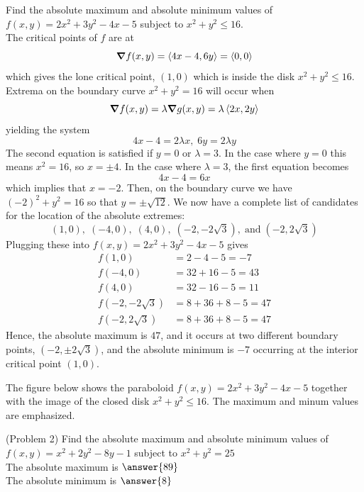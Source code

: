 \documentclass[handout]{ximera}
\begin{document}
\begin{example}[Example 2]
Find the absolute maximum and absolute minimum values 
of $f(x,y) = 2x^2 + 3y^2 - 4x - 5$ subject to $x^2 + y^2 \leq 16$.\\
The critical points of $f$ are at
\[
\boldsymbol\nabla f(x,y) = \left\langle 4x -4, 6y\right\rangle = \left\langle 0,0\right\rangle
\]
 which gives the lone critical point, $(1,0)$ which is inside the disk $x^2 + y^2 \leq 16$.\\
 Extrema on the boundary curve $x^2 + y^2 = 16$ will occur when
 \[
 \boldsymbol\nabla f(x,y) = \lambda \boldsymbol\nabla g(x,y) = \lambda \left\langle 2x, 2y\right\rangle
 \]
 yielding the system
 \[
 4x - 4 = 2\lambda x, \; 6y = 2\lambda y
 \]
 The second equation is satisfied if $y = 0$ or $\lambda = 3$.  In the case where $y = 0$ this means $x^2 = 16$, so $x = \pm 4$.
 In the case where $\lambda = 3$, the first equation becomes
 \[
 4x - 4 = 6x 
 \]
 which implies that $x = -2$.  Then, on the boundary curve we have $(-2)^2 + y^2 = 16$ so that $y = \pm \sqrt{12}$.
 We now have a complete list of candidates for the location of the absolute extremes:
 \[
 (1,0), \; (-4, 0), \; (4,0), \; (-2, -2\sqrt3), \;\text{and} \; (-2, 2\sqrt 3)
 \]
 Plugging these into $f(x,y) = 2x^2 + 3y^2 - 4x - 5$ gives
 \begin{align*}
 f(1,0) &= 2-4-5=-7\\
 f(-4, 0) &= 32 +16 -5 = 43\\
 f(4, 0) &= 32 -16 -5 = 11\\
 f(-2, -2\sqrt3) &= 8 + 36 +8-5 = 47\\
 f(-2, 2\sqrt3) &= 8 + 36 +8-5 = 47
 \end{align*}
 Hence, the absolute maximum is $47$, and it occurs at two different boundary points, $(-2, \pm 2\sqrt 3)$,
 and the absolute minimum is $-7$ occurring at the interior critical point $(1,0)$.
 
 
\end{example}

The figure below shows the paraboloid $f(x,y) = 2x^2 + 3y^2 - 4x - 5$ 
together with the image of the closed disk $x^2 + y^2 \leq 16$.
The maximum and minum values are emphasized.
\begin{center}
\end{center}

\begin{problem}(Problem 2)
Find the absolute maximum and absolute minimum values of $f(x,y) = x^2 + 2y^2 - 8y - 1$ subject to $x^2 + y^2 = 25$\\
The absolute maximum is $\answer{89}$\\
The absolute minimum is $\answer{8}$
\end{problem}
\end{document}
